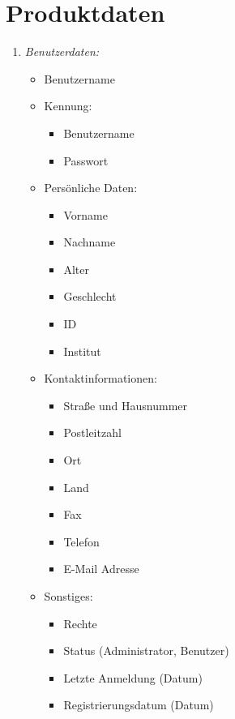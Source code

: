 \documentclass[parskip=full,11pt]{scrartcl}
\def\threedigits#1{%
  \ifnum#1<10 0\fi
  \ifnum#1<1 0\fi
  \number#1}
\begin{document}
\section{Produktdaten}
\begin{enumerate}[label={\textbf{/D\protect\threedigits{\theenumi}0/}}, leftmargin=*]
\subsubsection{Personendaten}
\item \textit{Benutzerdaten:}
\begin{itemize}
   \item Benutzername
   
   \item Kennung:
   \begin{itemize}
     \item Benutzername
     \item Passwort
   \end{itemize}
 
   \item Persönliche Daten:
   \begin{itemize}
     \item Vorname
     \item Nachname
     \item Alter
     \item Geschlecht
     \item ID
     \item Institut 
   \end{itemize}
   
    \item Kontaktinformationen:
   \begin{itemize}
     \item Straße und Hausnummer
     \item Postleitzahl 
     \item Ort
     \item Land
     \item Fax
     \item Telefon
     \item E-Mail Adresse  
   \end{itemize}
   
    \item Sonstiges:
   \begin{itemize}
     \item Rechte
     \item Status (Administrator, Benutzer) 
     \item Letzte Anmeldung (Datum) 
     \item Registrierungsdatum (Datum)    
   \end{itemize}
 

\end{itemize}
\end{enumerate}
\end{document}
